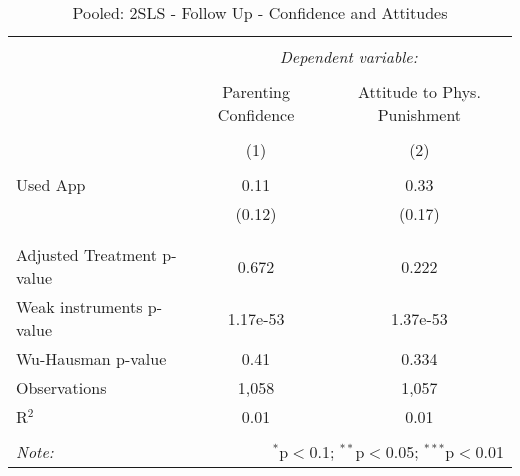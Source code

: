 
\begin{table}[!htbp] \centering 
  \caption{Pooled: 2SLS - Follow Up - Confidence and Attitudes} 
  \label{tbl:Pooled: 2SLS - Follow Up - Confidence and Attitudes} 
\begin{tabular}{@{\extracolsep{5pt}}lcc} 
\\[-1.8ex]\hline 
\hline \\[-1.8ex] 
 & \multicolumn{2}{c}{\textit{Dependent variable:}} \\ 
\cline{2-3} 
\\[-1.8ex] & Parenting Confidence & Attitude to Phys. Punishment \\ 
\\[-1.8ex] & (1) & (2)\\ 
\hline \\[-1.8ex] 
 Used App & 0.11 & 0.33 \\ 
  & (0.12) & (0.17) \\ 
  & & \\ 
\hline \\[-1.8ex] 
Adjusted Treatment p-value & 0.672 & 0.222 \\ 
Weak instruments p-value & 1.17e-53 & 1.37e-53 \\ 
Wu-Hausman p-value & 0.41 & 0.334 \\ 
Observations & 1,058 & 1,057 \\ 
R$^{2}$ & 0.01 & 0.01 \\ 
\hline 
\hline \\[-1.8ex] 
\textit{Note:}  & \multicolumn{2}{r}{$^{*}$p$<$0.1; $^{**}$p$<$0.05; $^{***}$p$<$0.01} \\ 
\end{tabular} 
\end{table} 
